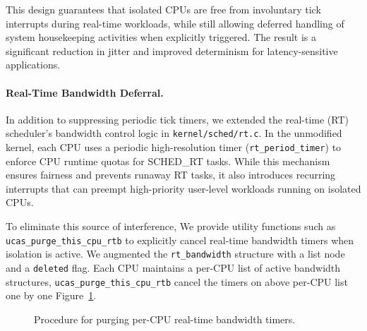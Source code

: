 \documentclass[letterpaper]{article}
\begin{document}
This design guarantees that isolated CPUs are free from involuntary tick 
interrupts during real-time workloads, while still allowing deferred handling 
of system housekeeping activities when explicitly triggered. The result is a 
significant reduction in jitter and improved determinism for 
latency-sensitive applications.

\paragraph{Real-Time Bandwidth Deferral.}
In addition to suppressing periodic tick timers, we extended the real-time (RT) 
scheduler’s bandwidth control logic in \texttt{kernel/sched/rt.c}. In the 
unmodified kernel, each CPU uses a periodic high-resolution timer 
(\texttt{rt\_period\_timer}) to enforce CPU runtime quotas for SCHED\_RT tasks. 
While this mechanism ensures fairness and prevents runaway RT tasks, it also 
introduces recurring interrupts that can preempt high-priority user-level 
workloads running on isolated CPUs.

To eliminate this source of interference, 
We provide utility functions such as 
\texttt{ucas\_purge\_this\_cpu\_rtb} to explicitly cancel real-time bandwidth timers when 
isolation is active. We augmented the \texttt{rt\_bandwidth} 
structure with a list node and a \texttt{deleted} flag. Each CPU maintains a 
per-CPU list of active bandwidth structures, \texttt{ucas\_purge\_this\_cpu\_rtb} cancel
the timers on above per-CPU list one by one Figure~\ref{fig:purge_flowchart}.

\begin{figure}[t]
\centering
{}
\caption{Procedure for purging per-CPU real-time bandwidth timers.}
\label{fig:purge_flowchart}
\end{figure}
\end{document}

